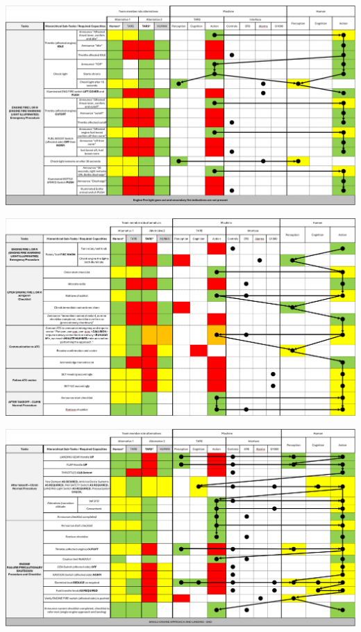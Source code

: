 \documentclass[12pt,a4paper]{article} %
\begin{document}
	\begin{table}[H]
		\centering
		\includegraphics[width=1\textwidth]{images/IA-table-3.png}
	\end{table}

	\begin{table}[H]
		\centering
		\includegraphics[width=1\textwidth]{images/IA-table-4.png}
	\end{table}

	\begin{table}[H]
		\centering
		\includegraphics[width=1\textwidth]{images/IA-table-5.png}
	\end{table}

	\printbibliography %
\end{document}
